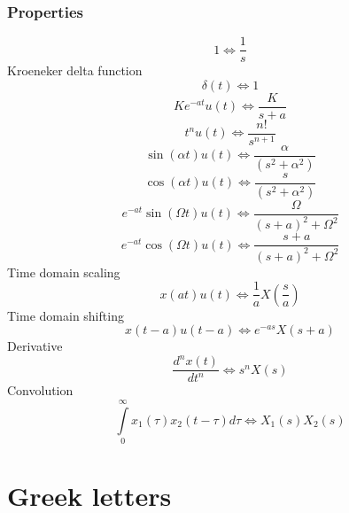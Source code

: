 \documentclass{article}
\begin{document}
		\subsubsection{Properties}
			\begin{equation}
				1 \Leftrightarrow \frac{1}{{s}}
			\end{equation}
			Kroeneker delta function
			\begin{equation}
				\delta (t) \Leftrightarrow 1
			\end{equation}
			\begin{equation}
				Ke^{ - at} u(t) \Leftrightarrow \frac{K}{{s + a}}			
			\end{equation}
			\begin{equation}
				t^n u(t) \Leftrightarrow \frac{{n!}}{{s^{n + 1} }}
			\end{equation}
			\begin{equation}
				\sin (\alpha t)u(t) \Leftrightarrow \frac{\alpha }{{(s^2 + \alpha ^2 )}}
			\end{equation}
			\begin{equation}
				\cos (\alpha t)u(t) \Leftrightarrow \frac{s}{{(s^2 + \alpha ^2 )}}
			\end{equation}
			\begin{equation}
			e^{ - at} \sin (\Omega t)u(t) \Leftrightarrow \frac{\Omega }{{(s + a)^2 + \Omega ^2 }}
			\end{equation}
			\begin{equation}
				e^{ - at} \cos (\Omega t)u(t) \Leftrightarrow \frac{{s + a}}{{(s + a)^2 + \Omega ^2 }}
			\end{equation}
			Time domain scaling
			\begin{equation}
				x(at)u(t) \Leftrightarrow \frac{1}{a}X\left( {\frac{s}{a}} \right)
			\end{equation}
			Time domain shifting 
			\begin{equation}
				x(t - a)u(t - a) \Leftrightarrow e^{ - as} X(s + a)
			\end{equation}
			Derivative
			\begin{equation}
				\frac{{d^n x(t)}}{{dt^n }} \Leftrightarrow s^n X(s)			
			\end{equation}
			Convolution
			\begin{equation}
			\int\limits_0^\infty {x_1 (\tau )x_2 (t - \tau )d\tau } \Leftrightarrow X_1 (s)X_2 (s)
			\end{equation}
\section{Greek letters}
\end{document}
